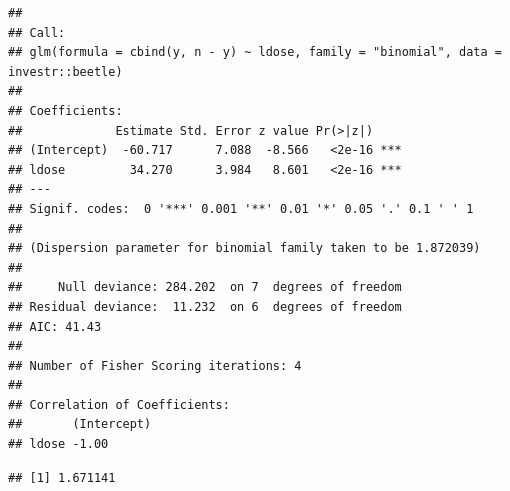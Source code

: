 \documentclass[
  ignorenonframetext,
]{beamer}
\newenvironment{Shaded}{\begin{snugshade}}{\end{snugshade}}
\newcommand{\AttributeTok}[1]{\textcolor[rgb]{0.13,0.29,0.53}{#1}}
\newcommand{\CommentTok}[1]{\textcolor[rgb]{0.56,0.35,0.01}{\textit{#1}}}
\newcommand{\FunctionTok}[1]{\textcolor[rgb]{0.13,0.29,0.53}{\textbf{#1}}}
\newcommand{\NormalTok}[1]{#1}
\newcommand{\OtherTok}[1]{\textcolor[rgb]{0.56,0.35,0.01}{#1}}
\newcommand{\SpecialCharTok}[1]{\textcolor[rgb]{0.81,0.36,0.00}{\textbf{#1}}}
\newcommand{\StringTok}[1]{\textcolor[rgb]{0.31,0.60,0.02}{#1}}
\begin{document}
\begin{frame}[fragile]
\begin{verbatim}
## 
## Call:
## glm(formula = cbind(y, n - y) ~ ldose, family = "binomial", data = investr::beetle)
## 
## Coefficients:
##             Estimate Std. Error z value Pr(>|z|)    
## (Intercept)  -60.717      7.088  -8.566   <2e-16 ***
## ldose         34.270      3.984   8.601   <2e-16 ***
## ---
## Signif. codes:  0 '***' 0.001 '**' 0.01 '*' 0.05 '.' 0.1 ' ' 1
## 
## (Dispersion parameter for binomial family taken to be 1.872039)
## 
##     Null deviance: 284.202  on 7  degrees of freedom
## Residual deviance:  11.232  on 6  degrees of freedom
## AIC: 41.43
## 
## Number of Fisher Scoring iterations: 4
## 
## Correlation of Coefficients:
##       (Intercept)
## ldose -1.00
\end{verbatim}

\begin{Shaded}
\end{Shaded}

\begin{verbatim}
## [1] 1.671141
\end{verbatim}
\end{frame}
\end{document}
